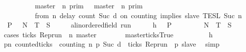 \begin{isabellebody}
\ \ \ \ \ \ \ \ {\isacharequal}\ {\isasymlbrakk}\ master\ {\isasymnot}{\isasymUp}\ n\ {\isasymrbrakk}\isactrlsub p\isactrlsub r\isactrlsub i\isactrlsub m\ {\isasymunion}\ {\isasymlbrakk}\ master\ {\isasymUp}\ n\ {\isasymrbrakk}\isactrlsub p\isactrlsub r\isactrlsub i\isactrlsub m\isanewline
\ \ \ \ \ \ \ \ {\isasyminter}\ {\isasymlbrakk}\ from\ n\ delay\ count\ {\isacharparenleft}Suc\ d{\isacharparenright}\ on\ counting\ implies\ slave\ {\isasymrbrakk}\isactrlsub T\isactrlsub E\isactrlsub S\isactrlsub L\isactrlbsup {\isasymge}\ Suc\ n\isactrlesup {\isacartoucheclose}\ {\isacharparenleft}\ {\isacartoucheopen}{\isacharbraceleft}{\isasymrho}{\isachardot}\ {\isacharquery}P\ {\isasymrho}{\isacharbraceright}\ {\isacharequal}\ {\isacharquery}N\ {\isasymunion}\ {\isacharquery}T\ {\isasyminter}\ {\isacharquery}S{\isacartoucheclose}{\isacharparenright}\isanewline
%
\isadelimproof
%
\endisadelimproof
%
\isatagproof
{}\isamarkupfalse%
\isanewline
\ \ \isacommand{{\isacharbraceleft}}\isamarkupfalse%
\ \isamarkupfalse%
\ {\isasymrho}{\isacharcolon}{\isacharcolon}{\isacartoucheopen}{\isacharparenleft}{\isacharprime}a{\isacharcolon}{\isacharcolon}linordered{\isacharunderscore}field{\isacharparenright}\ run{\isacartoucheclose}\isanewline
\ \ \ \ \isamarkupfalse%
\ h{\isacharcolon}{\isacartoucheopen}{\isasymrho}\ {\isasymin}\ {\isacharbraceleft}{\isasymrho}{\isachardot}\ {\isacharquery}P\ {\isasymrho}{\isacharbraceright}{\isacartoucheclose}\isanewline
\ \ \ \ \isamarkupfalse%
\ {\isacartoucheopen}{\isasymrho}\ {\isasymin}\ {\isacharquery}N\ {\isasymunion}\ {\isacharquery}T\ {\isasyminter}\ {\isacharquery}S{\isacartoucheclose}\isanewline
\ \ \ \ \isamarkupfalse%
\ {\isacharparenleft}cases\ {\isacartoucheopen}ticks\ {\isacharparenleft}Rep{\isacharunderscore}run\ {\isasymrho}\ n\ master{\isacharparenright}{\isacartoucheclose}{\isacharparenright}\isanewline
\ \ \ \ \ \ \isamarkupfalse%
\ master{\isacharunderscore}ticks{\isacharcolon}True\isanewline
\ \ \ \ \ \ \ \ \isamarkupfalse%
\ h\ \isamarkupfalse%
\ {\isacartoucheopen}{\isacharparenleft}{\isasymforall}p{\isasymge}n{\isachardot}\ counted{\isacharunderscore}ticks\ {\isasymrho}\ counting\ n\ p\ {\isacharparenleft}Suc\ d{\isacharparenright}\ {\isasymlongrightarrow}\ ticks\ {\isacharparenleft}Rep{\isacharunderscore}run\ {\isasymrho}\ p\ slave{\isacharparenright}{\isacharparenright}{\isacartoucheclose}\ \isamarkupfalse%
\ simp\isanewline
\ \ \ \ \ \ \ \ \isamarkupfalse%

\end{isabellebody}
